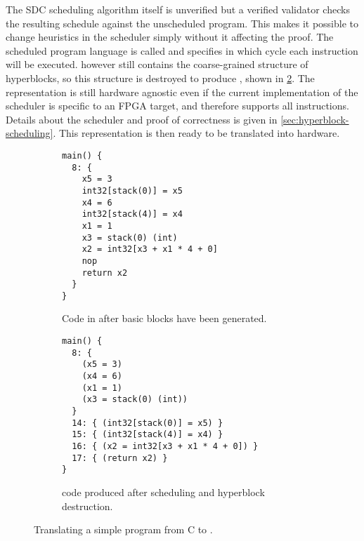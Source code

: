 The \gls{SDC} scheduling algorithm itself is unverified but a verified validator
checks the resulting schedule against the unscheduled program.  This makes it
possible to change heuristics in the scheduler simply without it affecting the
proof.  The scheduled program language is called \rtlpar{} and specifies in
which cycle each instruction will be executed.  \rtlpar{} however still contains
the coarse-grained structure of hyperblocks, so this structure is destroyed to
produce \rtlsubpar{}, shown in \cref{fig:accumulator_par}.  The representation
is still hardware agnostic even if the current implementation of the scheduler
is specific to an \gls{FPGA} target, and therefore supports all \rtl{}
instructions.  Details about the scheduler and proof of correctness is given in
\cref{sec:hyperblock-scheduling}.  This representation is then ready to be
translated into hardware.

\begin{figure}
  \centering
    \begin{subfigure}[b]{0.48\linewidth}
\begin{verbatim}
main() {
  8: {
    x5 = 3
    int32[stack(0)] = x5
    x4 = 6
    int32[stack(4)] = x4
    x1 = 1
    x3 = stack(0) (int)
    x2 = int32[x3 + x1 * 4 + 0]
    nop
    return x2
  }
}
\end{verbatim}
      \caption{Code in \rtlblock{} after basic blocks have been generated.}\label{fig:accumulator_seq}
    \end{subfigure}\hfill%
    \begin{subfigure}[b]{0.48\linewidth}
\begin{verbatim}
main() {
  8: {
    (x5 = 3)
    (x4 = 6)
    (x1 = 1)
    (x3 = stack(0) (int))
  }
  14: { (int32[stack(0)] = x5) }
  15: { (int32[stack(4)] = x4) }
  16: { (x2 = int32[x3 + x1 * 4 + 0]) }
  17: { (return x2) }
}
\end{verbatim}
      \caption{\rtlsubpar{} code produced after scheduling and hyperblock destruction.}\label{fig:accumulator_par}
    \end{subfigure}
    \caption{Translating a simple program from C to \rtl{}.}\label{fig:accumulator_gblseqpar}
\end{figure}



